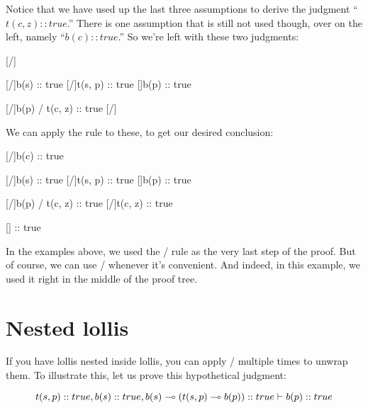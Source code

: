 \documentclass[../../../main.tex]{subfiles}
\begin{document}
\noindent
Notice that we have used up the last three assumptions to derive the judgment ``$t(c, z) :: true$.'' There is one assumption that is still not used though, over on the left, namely ``$b(c) :: true$.'' So we're left with these two judgments:

\begin{prooftree*}
  \hypo{}
  [\startrule/]{}

  \hypo{}
  [\startrule/]{b(s) :: true}
  \hypo{}
  [\startrule/]{t(s, p) :: true}
  []{b(p) :: true}
  
  \hypo{}
  [\startrule/]{b(p) \lolli/ t(c, z) :: true}  
  [\lolliElim/]{}

\end{prooftree*}

\noindent
We can apply the  rule to these, to get our desired conclusion:

\begin{prooftree*}
  \hypo{}
  [\startrule/]{b(c) :: true}

  \hypo{}
  [\startrule/]{b(s) :: true}
  \hypo{}
  [\startrule/]{t(s, p) :: true}
  []{b(p) :: true}
  
  \hypo{}
  [\startrule/]{b(p) \lolli/ t(c, z) :: true}  
  [\lolliElim/]{t(c, z) :: true}

  []{ :: true}
\end{prooftree*}

\noindent
In the examples above, we used the \lolliElim/ rule as the very last step of the proof. But of course, we can use \lolliElim/ whenever it's convenient. And indeed, in this example, we used it right in the middle of the proof tree.


\section{Nested lollis}

If you have lollis nested inside lollis, you can apply \lolliElim/ multiple times to unwrap them. To illustrate this, let us prove this hypothetical judgment:

\begin{equation*}
  t(s, p) :: true, b(s) :: true, b(s) \lolli/ (t(s, p) \lolli/ b(p)) :: true \ndturnstile/ b(p) :: true
\end{equation*}
\end{document}
